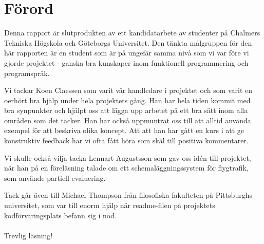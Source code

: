 \documentclass[Rapport]{subfiles}
\begin{document}
\section*{Förord}

Denna rapport är slutprodukten av ett kandidatarbete av studenter på
Chalmers Tekniska Högskola och Göteborgs Universitet. Den tänkta målgruppen för
den här rapporten är en student som är på ungefär samma nivå som vi var före vi
gjorde projektet - ganska bra kunskaper inom funktionell programmering och
programspråk.

Vi tackar Koen Claessen som varit vår handledare i projektet och som varit en
oerhört bra hjälp under hela projektets gång. Han har hela tiden kommit med bra
synpunkter och hjälpt oss att lägga upp arbetet på ett bra sätt inom alla områden
som det täcker. Han har också uppmuntrat oss till att alltid använda
exempel för att beskriva olika koncept. Att att han har gått en kurs i att ge
konstruktiv feedback har vi ofta fått höra som skäl till positiva kommentarer. 

Vi skulle också vilja tacka Lennart Augustsson som gav oss idén till projektet,
när han på en föreläsning talade om ett schemaläggningssystem för flygtrafik,
som använde partiell evaluering.

Tack går även till Michael Thompson från filosofiska fakulteten på Pittsburghs 
universitet, som var till enorm hjälp när readme-filen på projektets kodförvaringsplats
befann sig i nöd. %

\paragraph{} Trevlig läsning! %
        
        
\end{document}
